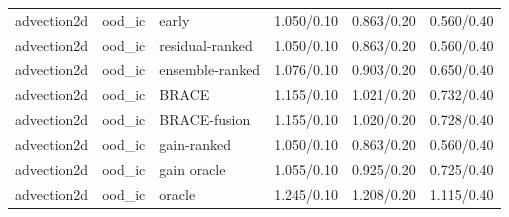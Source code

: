 \begin{tabular}{lllrrr}
advection2d & ood\_ic & early & 1.050/0.10 & 0.863/0.20 & 0.560/0.40 \\
advection2d & ood\_ic & residual-ranked & 1.050/0.10 & 0.863/0.20 & 0.560/0.40 \\
advection2d & ood\_ic & ensemble-ranked & 1.076/0.10 & 0.903/0.20 & 0.650/0.40 \\
advection2d & ood\_ic & BRACE & 1.155/0.10 & 1.021/0.20 & 0.732/0.40 \\
advection2d & ood\_ic & BRACE-fusion & 1.155/0.10 & 1.020/0.20 & 0.728/0.40 \\
advection2d & ood\_ic & gain-ranked & 1.050/0.10 & 0.863/0.20 & 0.560/0.40 \\
advection2d & ood\_ic & gain oracle & 1.055/0.10 & 0.925/0.20 & 0.725/0.40 \\
advection2d & ood\_ic & oracle & 1.245/0.10 & 1.208/0.20 & 1.115/0.40 \\
\midrule
\bottomrule
\end{tabular}
